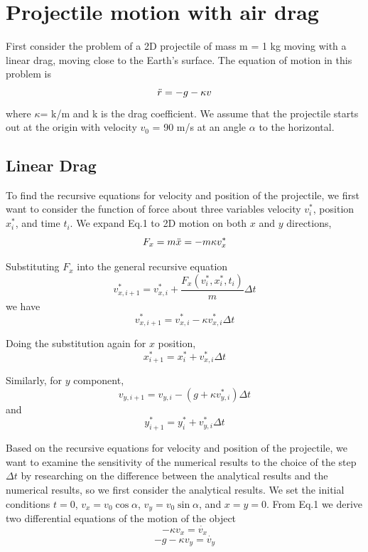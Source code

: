 \documentclass[12pt]{report}
\begin{document}
\section{Projectile motion with air drag}
First consider the problem of a 2D projectile of mass m = 1 kg moving with a linear drag, moving close to the Earth’s surface. The equation of motion in this problem is
\begin{equation}
    \Ddot{r}=-g-\kappa v
\end{equation}
where $\kappa$= k/m and k is the drag coefficient. We assume that the projectile starts out at the origin with velocity $v_{0}$ = 90 m/s at an angle $\alpha$ to the horizontal.
\subsection{Linear Drag}
To find the recursive equations for velocity and position of the projectile, we first want to consider the function of force about three variables velocity $v_i^*$, position $x_i^*$, and time $t_i$. We expand Eq.1 to 2D motion on both $x$ and $y$ directions,
\begin{equation}
    F_x=m\Ddot{x}=-m\kappa v_x^*
\end{equation}

Substituting $F_x$ into the general recursive equation
\begin{equation}
    v_{x,i+1}^*=v_{x,i}^*+\dfrac{F_x(v_i^*,x_i^*,t_i)}{m}\Delta t
\end{equation}
we have
\begin{equation}
    v_{x,i+1}^*=v_{x,i}^*-\kappa v_{x,i}^*\Delta t
\end{equation}

Doing the substitution again for $x$ position,
\begin{equation}
    x_{i+1}^*=x_i^*+v_{x,i}^*\Delta t
\end{equation}

Similarly, for $y$ component,
\begin{equation}
    v_{y,i+1}=v_{y,i}-(g+\kappa v_{y,i}^*)\Delta t
\end{equation}
and
\begin{equation}
    y_{i+1}^*=y_i^*+v_{y,i}^*\Delta t
\end{equation}

Based on the recursive equations for velocity and position of the projectile, we want to examine the sensitivity of the numerical results to the choice of the step $\Delta t$ by researching on the difference between the analytical results and the numerical results, so we first consider the analytical results. We set the initial conditions $t=0$, $v_x=v_0\cos{\alpha}$, $v_y=v_0\sin{\alpha}$, and $x=y=0$. From Eq.1 we derive two differential equations of the motion of the object
\begin{equation}
    -\kappa v_x=\dot{v_x}
\end{equation}
\begin{equation}
    -g-\kappa v_y=\dot{v_y}
\end{equation}
\end{document}

